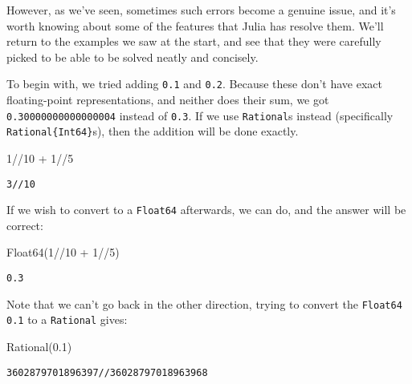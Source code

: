 \documentclass[
  letterpaper,
  DIV=11,
  numbers=noendperiod]{scrreprt}
\newenvironment{Shaded}{\begin{snugshade}}{\end{snugshade}}
\newcommand{\FloatTok}[1]{\textcolor[rgb]{0.68,0.00,0.00}{#1}}
\newcommand{\FunctionTok}[1]{\textcolor[rgb]{0.28,0.35,0.67}{#1}}
\newcommand{\NormalTok}[1]{\textcolor[rgb]{0.00,0.23,0.31}{#1}}
\newcommand{\OperatorTok}[1]{\textcolor[rgb]{0.37,0.37,0.37}{#1}}
\begin{document}
However, as we've seen, sometimes such errors become a genuine issue,
and it's worth knowing about some of the features that Julia has resolve
them. We'll return to the examples we saw at the start, and see that
they were carefully picked to be able to be solved neatly and concisely.

To begin with, we tried adding \texttt{0.1} and \texttt{0.2}. Because
these don't have exact floating-point representations, and neither does
their sum, we got \texttt{0.30000000000000004} instead of \texttt{0.3}.
If we use \texttt{Rational}s instead (specifically
\texttt{Rational\{Int64\}}s), then the addition will be done exactly.

\begin{Shaded}
\begin{Highlighting}[]
\FloatTok{1}\OperatorTok{//}\FloatTok{10} \OperatorTok{+} \FloatTok{1}\OperatorTok{//}\FloatTok{5}
\end{Highlighting}
\end{Shaded}

\begin{verbatim}
3//10
\end{verbatim}

If we wish to convert to a \texttt{Float64} afterwards, we can do, and
the answer will be correct:

\begin{Shaded}
\begin{Highlighting}[]
\FunctionTok{Float64}\NormalTok{(}\FloatTok{1}\OperatorTok{//}\FloatTok{10} \OperatorTok{+} \FloatTok{1}\OperatorTok{//}\FloatTok{5}\NormalTok{)}
\end{Highlighting}
\end{Shaded}

\begin{verbatim}
0.3
\end{verbatim}

Note that we can't go back in the other direction, trying to convert the
\texttt{Float64} \texttt{0.1} to a \texttt{Rational} gives:

\begin{Shaded}
\begin{Highlighting}[]
\FunctionTok{Rational}\NormalTok{(}\FloatTok{0.1}\NormalTok{)}
\end{Highlighting}
\end{Shaded}

\begin{verbatim}
3602879701896397//36028797018963968
\end{verbatim}
\end{document}
